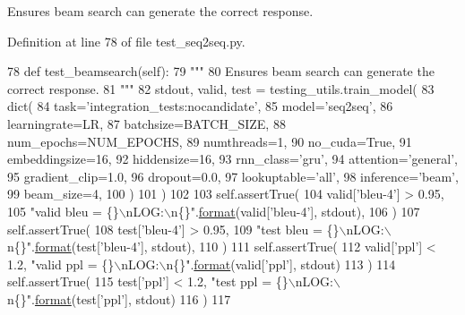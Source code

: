 \begin{DoxyVerb}Ensures beam search can generate the correct response.
\end{DoxyVerb}
 

Definition at line 78 of file test\+\_\+seq2seq.\+py.


\begin{DoxyCode}
78     \textcolor{keyword}{def }test\_beamsearch(self):
79         \textcolor{stringliteral}{"""}
80 \textcolor{stringliteral}{        Ensures beam search can generate the correct response.}
81 \textcolor{stringliteral}{        """}
82         stdout, valid, test = testing\_utils.train\_model(
83             dict(
84                 task=\textcolor{stringliteral}{'integration\_tests:nocandidate'},
85                 model=\textcolor{stringliteral}{'seq2seq'},
86                 learningrate=LR,
87                 batchsize=BATCH\_SIZE,
88                 num\_epochs=NUM\_EPOCHS,
89                 numthreads=1,
90                 no\_cuda=\textcolor{keyword}{True},
91                 embeddingsize=16,
92                 hiddensize=16,
93                 rnn\_class=\textcolor{stringliteral}{'gru'},
94                 attention=\textcolor{stringliteral}{'general'},
95                 gradient\_clip=1.0,
96                 dropout=0.0,
97                 lookuptable=\textcolor{stringliteral}{'all'},
98                 inference=\textcolor{stringliteral}{'beam'},
99                 beam\_size=4,
100             )
101         )
102 
103         self.assertTrue(
104             valid[\textcolor{stringliteral}{'bleu-4'}] > 0.95,
105             \textcolor{stringliteral}{"valid bleu = \{\}\(\backslash\)nLOG:\(\backslash\)n\{\}"}.\hyperlink{namespaceparlai_1_1chat__service_1_1services_1_1messenger_1_1shared__utils_a32e2e2022b824fbaf80c747160b52a76}{format}(valid[\textcolor{stringliteral}{'bleu-4'}], stdout),
106         )
107         self.assertTrue(
108             test[\textcolor{stringliteral}{'bleu-4'}] > 0.95,
109             \textcolor{stringliteral}{"test bleu = \{\}\(\backslash\)nLOG:\(\backslash\)n\{\}"}.\hyperlink{namespaceparlai_1_1chat__service_1_1services_1_1messenger_1_1shared__utils_a32e2e2022b824fbaf80c747160b52a76}{format}(test[\textcolor{stringliteral}{'bleu-4'}], stdout),
110         )
111         self.assertTrue(
112             valid[\textcolor{stringliteral}{'ppl'}] < 1.2, \textcolor{stringliteral}{"valid ppl = \{\}\(\backslash\)nLOG:\(\backslash\)n\{\}"}.\hyperlink{namespaceparlai_1_1chat__service_1_1services_1_1messenger_1_1shared__utils_a32e2e2022b824fbaf80c747160b52a76}{format}(valid[\textcolor{stringliteral}{'ppl'}], stdout)
113         )
114         self.assertTrue(
115             test[\textcolor{stringliteral}{'ppl'}] < 1.2, \textcolor{stringliteral}{"test ppl = \{\}\(\backslash\)nLOG:\(\backslash\)n\{\}"}.\hyperlink{namespaceparlai_1_1chat__service_1_1services_1_1messenger_1_1shared__utils_a32e2e2022b824fbaf80c747160b52a76}{format}(test[\textcolor{stringliteral}{'ppl'}], stdout)
116         )
117 
\end{DoxyCode}

